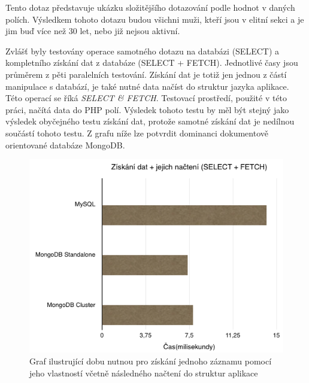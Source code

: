 Tento dotaz představuje ukázku složitějšího dotazování podle hodnot v daných polích. Výsledkem tohoto dotazu budou všichni muži, kteří jsou v elitní sekci a je jim buď více než 30 let, nebo již nejsou aktivní. 

Zvlášť byly testovány operace samotného dotazu na databázi (SELECT) a kompletního získání dat z databáze (SELECT + FETCH). Jednotlivé časy jsou průměrem z pěti paralelních testování. Získání dat je totiž jen jednou z částí manipulace s databází, je také nutné data načíst do struktur jazyka aplikace. Této operací se říká \emph{SELECT \& FETCH}. Testovací prostředí, použité v této práci, načítá data do PHP polí. Výsledek tohoto testu by měl být stejný jako výsledek obyčejného testu získání dat, protože samotné získání dat je nedílnou součástí tohoto testu. Z grafu níže lze potvrdit dominanci dokumentově orientované databáze MongoDB.
\begin{figure}[h]
\begin{centering}
\includegraphics[scale=0.6]{obrazky/grafy/selectfetch}
\par\end{centering}
\caption{Graf ilustrující dobu nutnou pro získání jednoho záznamu pomocí jeho vlastností včetně následného načtení do struktur aplikace}
\end{figure}

\FloatBarrier
